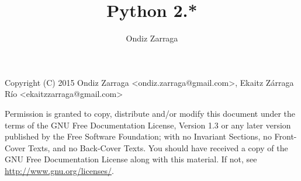 \documentclass[a4paper,10pt]{article}
\title{Python 2.*}
\author{Ondiz Zarraga}
\begin{document}
\maketitle

\begin{abstract}
 
\end{abstract}

\newpage
Copyright (C)  2015  Ondiz Zarraga \textless ondiz.zarraga@gmail.com\textgreater, Ekaitz Zárraga Río \textless ekaitzzarraga@gmail.com\textgreater

Permission is granted to copy, distribute and/or modify this document under the terms of the GNU Free
Documentation License, Version 1.3 or any later version published by the Free Software Foundation; with
no Invariant Sections, no Front-Cover Texts, and no Back-Cover Texts. You should have received a copy of
the GNU Free Documentation License along with this material. If not, see \url{http://www.gnu.org/licenses/}.
\newpage

\newpage
  \tableofcontents
\newpage
{}










\end{document}
